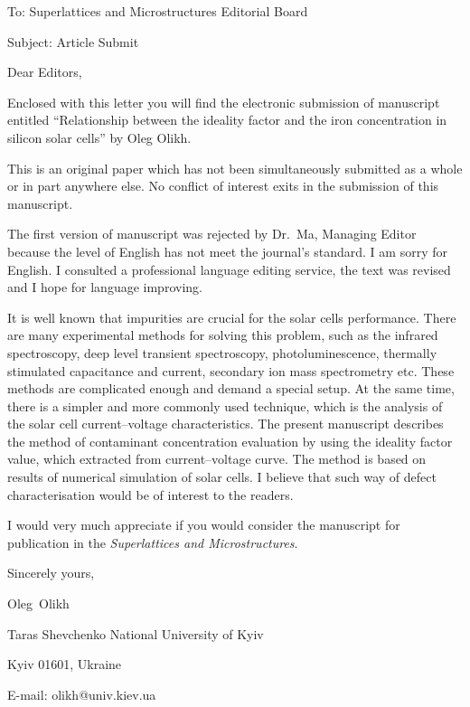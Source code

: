 \documentclass[preprint]{elsarticle}
\begin{document}
To:
Superlattices and Microstructures Editorial Board


Subject:
Article Submit

\vspace{5mm}
Dear Editors,

\vspace{3mm}
Enclosed with this letter you will find the electronic submission of manuscript entitled
``Relationship between the ideality factor and the iron concentration in silicon solar cells'' by Oleg Olikh.



This is an original paper which has not been simultaneously submitted as a whole or in part anywhere else.
No conflict of interest exits in the submission of this manuscript.


The first version of manuscript was rejected by Dr.~Ma, Managing Editor because
the level of English has not meet the journal's standard.
I am sorry for English. 
I consulted a professional language editing service, the text was revised and I hope for language improving.


It is well known that impurities are crucial for the solar cells performance.
There are many experimental methods for solving this problem, such as the infrared spectroscopy, deep level transient spectroscopy, photoluminescence,
thermally stimulated capacitance and current, secondary ion mass spectrometry etc.
These methods are complicated  enough and demand a special setup.
At the same time, there is a simpler and more commonly used technique, which is the analysis of the solar cell current--voltage characteristics.
The present manuscript describes the method of contaminant concentration evaluation by using the ideality factor value, which extracted from current--voltage curve.
The method is based on results of numerical simulation of solar cells.
I believe that such way of defect characterisation would be of interest to the readers.


I would  very much appreciate if you would consider the manuscript for publication in the \emph{Superlattices and Microstructures}.

\vspace{3mm}

Sincerely yours,

Oleg~Olikh


Taras Shevchenko National University of Kyiv


Kyiv 01601, Ukraine

E-mail: olikh@univ.kiev.ua


\end{document}

